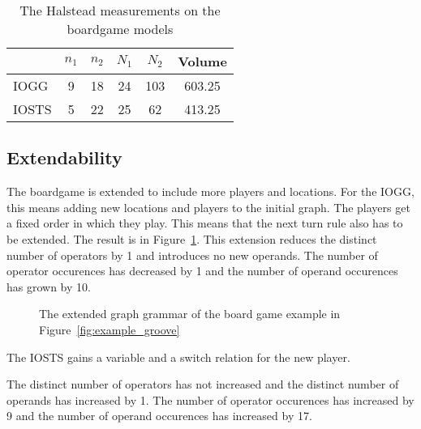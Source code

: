 \begin{table}[ht]
\begin{center}
\begin{tabular}{| l | c | c | c | c | c |}
  \hline
  & $n_1$ & $n_2$ & $N_1$ & $N_2$ & Volume \\ \hline
  IOGG & 9 & 18 & 24 & 103 & 603.25 \\ \hline
  IOSTS & 5 & 22 & 25 & 62 & 413.25 \\
  \hline
\end{tabular}
\end{center}
\caption{The Halstead measurements on the boardgame models}
\label{tab:halstead-bg}
\end{table}


\subsection{Extendability}
The boardgame is extended to include more players and locations. For the IOGG, this means adding new locations and players to the initial graph. The players get a fixed order in which they play. This means that the next turn rule also has to be extended. The result is in Figure~\ref{fig:gg-bg-extended}. This extension reduces the distinct number of operators by 1 and introduces no new operands. The number of operator occurences has decreased by 1 and the number of operand occurences has grown by 10.

\begin{figure}[ht]
  \begin{center}
    \hspace{20px}
  \end{center}
  \caption{The extended graph grammar of the board game example in Figure~\ref{fig:example_groove}}
  \label{fig:gg-bg-extended}
\end{figure}

The IOSTS gains a variable and a switch relation for the new player. \begin{comment}The result is in Figure~\ref{fig:sts-bg-extended}.\end{comment} The distinct number of operators has not increased and the distinct number of operands has increased by 1. The number of operator occurences has increased by 9 and the number of operand occurences has increased by 17.


